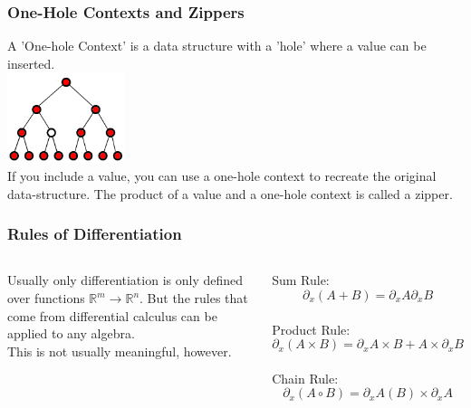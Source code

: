 \documentclass[10pt]{beamer}
\begin{document}
\begin{frame}[fragile]
    \frametitle{One-Hole Contexts and Zippers}
    \centering
    A 'One-hole Context' is a data structure with a 'hole' where a value can be inserted. \\
    \includegraphics[height=100px]{one-hole_context.png} \\
    If you include a value, you can use a one-hole context to recreate the original data-structure. The product of a value and a one-hole context is called a zipper.
\end{frame}


\begin{frame}[fragile]
    \frametitle{Rules of Differentiation}
    \begin{columns} %
    Usually only differentiation is only defined over functions $ \mathbb{R}^m \rightarrow \mathbb{R}^n $. But the rules that come from differential calculus can be applied to any algebra. \\
    This is not usually meaningful, however.
    

    Sum Rule:
    $$ \partial_x (A+B) = \partial_x A \partial_x B $$ \\
    
    Product Rule:
    $$ \partial_x (A \times B) = \partial_x A \times B + A \times \partial_x B $$ \\

    Chain Rule:
    $$ \partial_x (A \circ B) = \partial_x A (B) \times \partial_x A $$

    \end{columns}
\end{frame}
\end{document}
